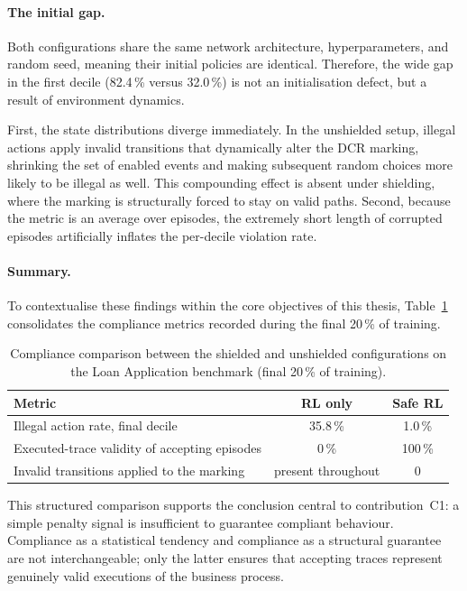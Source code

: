\paragraph{The initial gap.}
Both configurations share the same network architecture, hyperparameters, and random seed, meaning their initial policies are identical. Therefore, the wide gap in the first decile (82.4\,\% versus 32.0\,\%) is not an initialisation defect, but a result of environment dynamics.

First, the state distributions diverge immediately. In the unshielded setup, illegal actions apply invalid transitions that dynamically alter the DCR marking, shrinking the set of enabled events and making subsequent random choices more likely to be illegal as well. This compounding effect is absent under shielding, where the marking is structurally forced to stay on valid paths. Second, because the metric is an average over episodes, the extremely short length of corrupted episodes artificially inflates the per-decile violation rate.

\paragraph{Summary.}
To contextualise these findings within the core objectives of this thesis, Table~\ref{tab:ablation_compliance} consolidates the compliance metrics recorded during the final 20\,\% of training.

\begin{table}[H]
\centering
\caption{Compliance comparison between the shielded and unshielded configurations on the Loan Application benchmark (final 20\,\% of training).}
\label{tab:ablation_compliance}
\begin{tabular}{lcc}
\toprule
\textbf{Metric} & \textbf{\ac{RL} only} & \textbf{Safe \ac{RL}} \\
\midrule
Illegal action rate, final decile & 35.8\,\% & 1.0\,\% \\
Executed-trace validity of accepting episodes & 0\,\% & 100\,\% \\
Invalid transitions applied to the marking & present throughout & 0 \\
\bottomrule
\end{tabular}
\end{table}

This structured comparison supports the conclusion central to contribution~C1: a simple penalty signal is insufficient to guarantee compliant behaviour. Compliance as a statistical tendency and compliance as a structural guarantee are not interchangeable; only the latter ensures that accepting traces represent genuinely valid executions of the business process.

